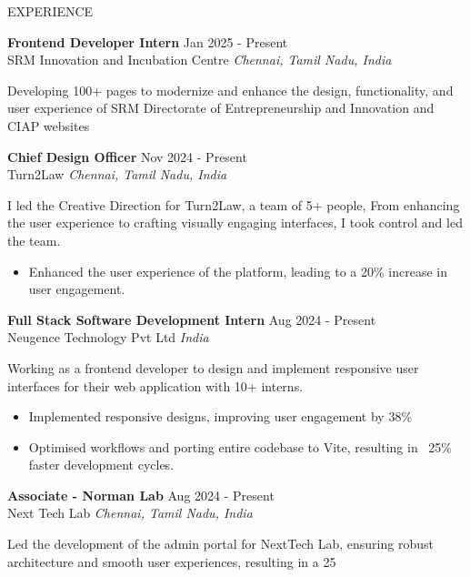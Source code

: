 \documentclass{resume}
\begin{document}
\vspace{1.5em}


\begin{rSection}{EXPERIENCE}

\textbf{Frontend Developer Intern} \hfill Jan 2025 - Present\\
SRM Innovation and Incubation Centre \hfill \textit{Chennai, Tamil Nadu, India}

Developing 100+ pages to modernize and enhance the design, functionality, and user experience of SRM Directorate of Entrepreneurship and Innovation and CIAP websites

\textbf{Chief Design Officer} \hfill Nov 2024 - Present\\
Turn2Law \hfill \textit{Chennai, Tamil Nadu, India}

I led the Creative Direction for Turn2Law, a team of 5+ people, From enhancing the user experience to crafting visually engaging interfaces, I took control and led the team.

\begin{itemize}
\item Enhanced the user experience of the platform, leading to a 20\% increase in user engagement.
\end{itemize}
\textbf{Full Stack Software Development Intern} \hfill Aug 2024 - Present\\
Neugence Technology Pvt Ltd \hfill \textit{India}

Working as a frontend developer to design and implement responsive user interfaces for their web application with 10+ interns.

\begin{itemize}
\item Implemented responsive designs, improving user engagement by 38\%
\item Optimised workflows and porting entire codebase to Vite, resulting in ~25\% faster development cycles.
\end{itemize}
\textbf{Associate - Norman Lab} \hfill Aug 2024 - Present\\
Next Tech Lab \hfill \textit{Chennai, Tamil Nadu, India}

Led the development of the admin portal for NextTech Lab, ensuring robust architecture and smooth user experiences, resulting in a 25%


\end{rSection}
\end{document}
